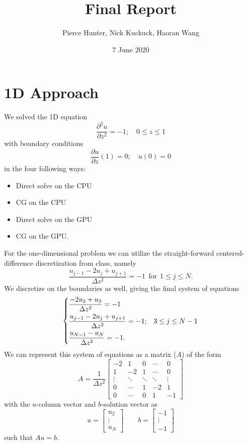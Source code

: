 \documentclass[11pt]{article}
\title{\textbf{Final Report}}
\author{Pierce Hunter, Nick Kuckuck, Haoran Wang}
\date{7 June 2020}
\newcommand{\pd}[2]{\frac{\partial #1}{\partial #2}}
\begin{document}
\maketitle
\section{1D Approach}
	We solved the 1D equation
	\begin{equation}
		\pd{^2u}{z^2} = -1; \quad 0\leq z\leq 1
	\end{equation}
	with boundary conditions
	\begin{equation}
		\pd{u}{z}\left(1\right) = 0; \quad u(0) = 0
	\end{equation}
	in the four following ways:
	\begin{itemize}
		\item Direct solve on the CPU
		\item CG on the CPU
		\item Direct solve on the GPU
		\item CG on the GPU.
	\end{itemize}
	For the one-dimensional problem we can utilize the straight-forward centered-difference discretization from class, namely
	\begin{equation}
		\frac{u_{j-1}-2u_j+u_{j+1}}{\Delta z^2} = -1 ~~\text{for}~~ 1\leq j\leq N.
	\end{equation}
	We discretize on the boundaries as well, giving the final system of equations
	\begin{equation}
		\begin{dcases}
		\frac{-2u_2 + u_3}{\Delta z^2} = -1\\
		\frac{u_{j-1}-2u_j+u_{j+1}}{\Delta z^2} = -1;& 3\leq j\leq N-1\\
		\frac{u_{N-1} - u_N}{\Delta z^2} = -1.
		\end{dcases}
	\end{equation}
	We can represent this system of equations as a matrix ($ A $) of the form
	\begin{equation}
		A = \frac{1}{\Delta z^2}\begin{bmatrix}
		-2&1&0&\cdots&0\\
		1&-2&1&\cdots&0\\
		\vdots&\ddots&\ddots&\ddots&\vdots\\
		0&\cdots&1&-2&1\\
		0&\cdots&0&1&-1
		\end{bmatrix}
	\end{equation}
	with the $ u $-column vector and $ b $-solution vector as
	\begin{equation}
		u = \begin{bmatrix}
		u_2\\
		\vdots\\
		u_N
		\end{bmatrix} \qquad b = \begin{bmatrix}
		-1\\\vdots\\-1
		\end{bmatrix}
	\end{equation}
	such that $ Au = b $.
\end{document}
